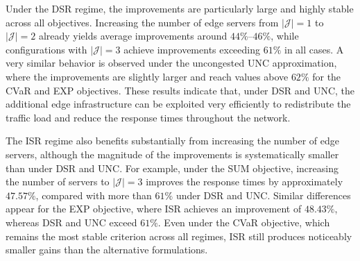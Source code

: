 \documentclass[a4paper,11pt,reqno]{amsart}
\newcommand{\J}{\mathcal{J}}
\begin{document}
Under the DSR regime, the improvements are particularly large and highly stable across all objectives. Increasing the number of edge servers from $|\J|=1$ to $|\J|=2$ already yields average improvements around $44\%$--$46\%$, while configurations with $|\J|=3$ achieve improvements exceeding $61\%$ in all cases. A very similar behavior is observed under the uncongested UNC approximation, where the improvements are slightly larger and reach values above $62\%$ for the CVaR and EXP objectives. These results indicate that, under DSR and UNC, the additional edge infrastructure can be exploited very efficiently to redistribute the traffic load and reduce the response times throughout the network.

The ISR regime also benefits substantially from increasing the number of edge servers, although the magnitude of the improvements is systematically smaller than under DSR and UNC. For example, under the SUM objective, increasing the number of servers to $|\J|=3$ improves the response times by approximately $47.57\%$, compared with more than $61\%$ under DSR and UNC. Similar differences appear for the EXP objective, where ISR achieves an improvement of $48.43\%$, whereas DSR and UNC exceed $61\%$. Even under the CVaR objective, which remains the most stable criterion across all regimes, ISR still produces noticeably smaller gains than the alternative formulations.
\end{document}
